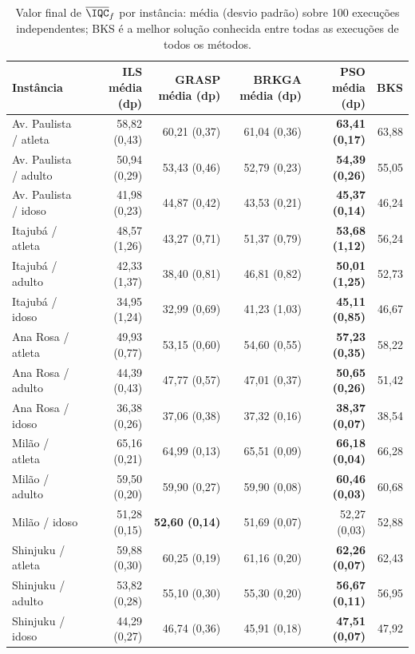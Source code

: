 \begin{table}[t]
\centering
\caption{Valor final de $\overline{\IQC}_f$ por instância: média (desvio padrão) sobre 100 execuções independentes; BKS é a melhor solução conhecida entre todas as execuções de todos os métodos.}
\label{tab:descriptive}
\footnotesize
\begin{tabular}{@{}lrrrrr@{}}
\toprule
Instância & ILS média (dp) & GRASP média (dp) & BRKGA média (dp) & PSO média (dp) & BKS \\
\midrule
Av. Paulista / atleta & 58,82 (0,43) & 60,21 (0,37) & 61,04 (0,36) & \textbf{63,41 (0,17)} & 63,88 \\
Av. Paulista / adulto & 50,94 (0,29) & 53,43 (0,46) & 52,79 (0,23) & \textbf{54,39 (0,26)} & 55,05 \\
Av. Paulista / idoso & 41,98 (0,23) & 44,87 (0,42) & 43,53 (0,21) & \textbf{45,37 (0,14)} & 46,24 \\
Itajubá / atleta & 48,57 (1,26) & 43,27 (0,71) & 51,37 (0,79) & \textbf{53,68 (1,12)} & 56,24 \\
Itajubá / adulto & 42,33 (1,37) & 38,40 (0,81) & 46,81 (0,82) & \textbf{50,01 (1,25)} & 52,73 \\
Itajubá / idoso & 34,95 (1,24) & 32,99 (0,69) & 41,23 (1,03) & \textbf{45,11 (0,85)} & 46,67 \\
Ana Rosa / atleta & 49,93 (0,77) & 53,15 (0,60) & 54,60 (0,55) & \textbf{57,23 (0,35)} & 58,22 \\
Ana Rosa / adulto & 44,39 (0,43) & 47,77 (0,57) & 47,01 (0,37) & \textbf{50,65 (0,26)} & 51,42 \\
Ana Rosa / idoso & 36,38 (0,26) & 37,06 (0,38) & 37,32 (0,16) & \textbf{38,37 (0,07)} & 38,54 \\
Milão / atleta & 65,16 (0,21) & 64,99 (0,13) & 65,51 (0,09) & \textbf{66,18 (0,04)} & 66,28 \\
Milão / adulto & 59,50 (0,20) & 59,90 (0,27) & 59,90 (0,08) & \textbf{60,46 (0,03)} & 60,68 \\
Milão / idoso & 51,28 (0,15) & \textbf{52,60 (0,14)} & 51,69 (0,07) & 52,27 (0,03) & 52,88 \\
Shinjuku / atleta & 59,88 (0,30) & 60,25 (0,19) & 61,16 (0,20) & \textbf{62,26 (0,07)} & 62,43 \\
Shinjuku / adulto & 53,82 (0,28) & 55,10 (0,30) & 55,30 (0,20) & \textbf{56,67 (0,11)} & 56,95 \\
Shinjuku / idoso & 44,29 (0,27) & 46,74 (0,36) & 45,91 (0,18) & \textbf{47,51 (0,07)} & 47,92 \\
\bottomrule
\end{tabular}
\end{table}
